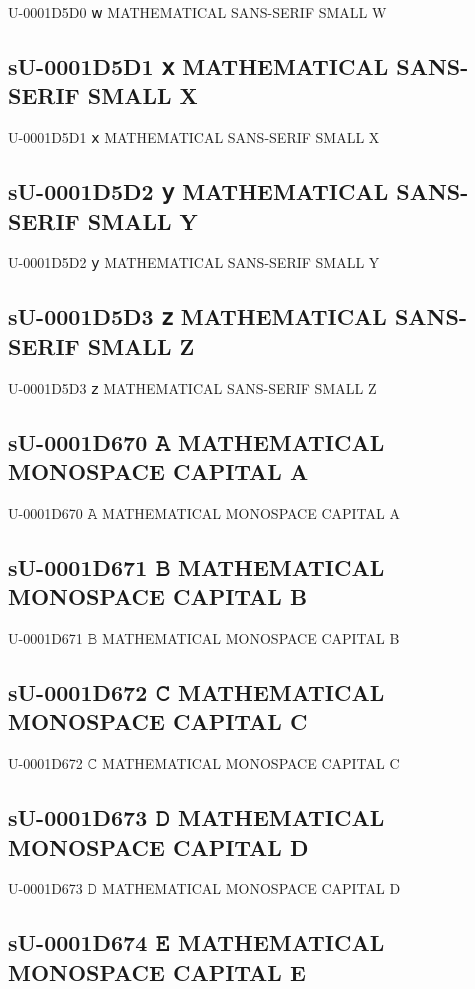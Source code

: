 U-0001D5D0 𝗐 MATHEMATICAL SANS-SERIF SMALL W

\subsection{sU-0001D5D1 𝗑 MATHEMATICAL SANS-SERIF SMALL X}

U-0001D5D1 𝗑 MATHEMATICAL SANS-SERIF SMALL X

\subsection{sU-0001D5D2 𝗒 MATHEMATICAL SANS-SERIF SMALL Y}

U-0001D5D2 𝗒 MATHEMATICAL SANS-SERIF SMALL Y

\subsection{sU-0001D5D3 𝗓 MATHEMATICAL SANS-SERIF SMALL Z}

U-0001D5D3 𝗓 MATHEMATICAL SANS-SERIF SMALL Z

\subsection{sU-0001D670 𝙰 MATHEMATICAL MONOSPACE CAPITAL A}

U-0001D670 𝙰 MATHEMATICAL MONOSPACE CAPITAL A

\subsection{sU-0001D671 𝙱 MATHEMATICAL MONOSPACE CAPITAL B}

U-0001D671 𝙱 MATHEMATICAL MONOSPACE CAPITAL B

\subsection{sU-0001D672 𝙲 MATHEMATICAL MONOSPACE CAPITAL C}

U-0001D672 𝙲 MATHEMATICAL MONOSPACE CAPITAL C

\subsection{sU-0001D673 𝙳 MATHEMATICAL MONOSPACE CAPITAL D}

U-0001D673 𝙳 MATHEMATICAL MONOSPACE CAPITAL D

\subsection{sU-0001D674 𝙴 MATHEMATICAL MONOSPACE CAPITAL E}

